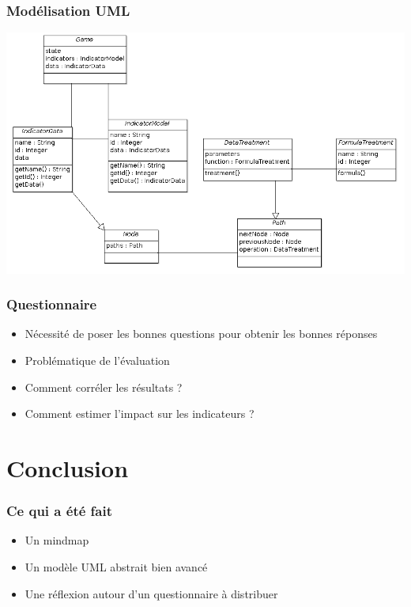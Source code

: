 \documentclass{beamer}
\begin{document}
  \begin{frame}
   \frametitle{Modélisation UML}
   \begin{center}
    \includegraphics[scale=0.3]{uml.png}
   \end{center}

  \end{frame}
  
  \begin{frame}
   \frametitle{Questionnaire}
   \begin{itemize}
    \item Nécessité de poser les bonnes questions pour obtenir les bonnes réponses
    \item Problématique de l'évaluation
    \item Comment corréler les résultats ?
    \item Comment estimer l'impact sur les indicateurs ?
   \end{itemize}

  \end{frame}

  \section{Conclusion}
  \begin{frame}
   \frametitle{Ce qui a été fait} 
   \begin{itemize}
    \item Un mindmap
    \item Un modèle UML abstrait bien avancé
    \item Une réflexion autour d'un questionnaire à distribuer
   \end{itemize}
  \end{frame}
  
\end{document}
